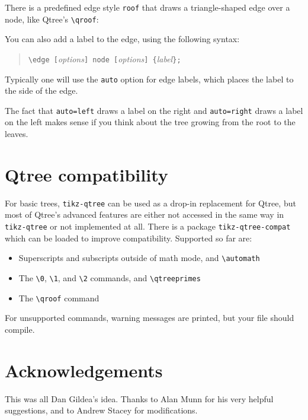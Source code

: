 \documentclass{article}
\newcommand\tikztree{\texttt{tikz-qtree}}
\begin{document}
There is a predefined edge style \verb|roof| that draws a triangle-shaped edge over a node, like Qtree's \verb|\qroof|:
\begin{center}
\begin{Example}
\end{Example}
\end{center}

You can also add a label to the edge, using the following syntax:
\begin{quote}
\verb|\edge [|\textit{options}\verb|] node [|\textit{options}\verb|] {|\textit{label}\verb|};|
\end{quote}
Typically one will use the \verb|auto| option for edge labels, which
places the label to the side of the edge.
\begin{center}
\begin{SideBySideExample}[xrightmargin=1.25in]
\newcommand{\initial}[1]{\ensuremath{\alpha_{\textrm{\scriptsize #1}}}}
\newcommand{\auxiliary}[1]{\ensuremath{\beta_{\textrm{\scriptsize #1}}}}
\end{SideBySideExample}
\end{center}
The fact that \verb|auto=left| draws a label on the right and
\verb|auto=right| draws a label on the left makes sense if you think
about the tree growing from the root to the leaves.

\section{Qtree compatibility}

For basic trees, \tikztree{} can be used as a drop-in replacement for Qtree, but most of Qtree's advanced features are either not accessed in the same way in \tikztree{} or not implemented at all. There is a package \verb|tikz-qtree-compat| which can be loaded to improve compatibility. Supported so far are:
\begin{itemize}
\item Superscripts and subscripts outside of math mode, and \verb|\automath|
\item The \verb|\0|, \verb|\1|, and \verb|\2| commands, and \verb|\qtreeprimes|
\item The \verb|\qroof| command
\end{itemize}
For unsupported commands, warning messages are printed, but your file should compile.

\section*{Acknowledgements}
This was all Dan Gildea's idea. Thanks to Alan Munn for his very helpful suggestions, and to Andrew Stacey for modifications.
\end{document}
